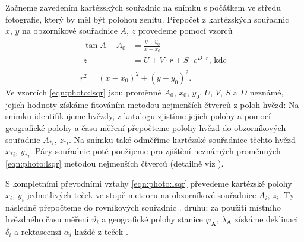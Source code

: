Začneme zavedením kartézských souřadnic na snímku s počátkem ve středu fotografie, který by měl být polohou zenitu. Přepočet z kartézských souřadnic $x,\,y$ na obzorníkové souřadnice $A,\,z$ provedeme pomocí vzorců \cite{ceplecha}
\begin{eqnarray}
    \begin{aligned}
        \tan{A-A_0} & =\frac{y-y_0}{x-x_0}                        \\
        z           & =U+V\cdot r+S\cdot e^{D\cdot r}\text{, kde}
    \end{aligned}\label{eqn:photo:lsqr}\\
    r^2=(x-x_0)^2+(y-y_0)^2\text{.}
\end{eqnarray}
Ve vzorcích \eqref{eqn:photo:lsqr} jsou proměnné $A_0,\,x_0,\,y_0,\,U,\,V,\,S$ a $D$ neznámé, jejich hodnoty získáme fitováním metodou nejmenších čtverců z poloh hvězd: Na snímku identifikujeme hvězdy, z katalogu zjistíme jejich polohy a pomocí geografické polohy a času měření přepočteme polohy hvězd do obzorníkových souřadnic $A_{\ast i},\,z_{\ast i}$. Na snímku také odměříme kartézské souřadnice těchto hvězd $x_{\ast i},\,y_{\ast i}$. Páry souřadnic poté použijeme pro zjištění neznámých proměnných \eqref{eqn:photo:lsqr} metodou nejmenších čtverců (detailně viz \cite[223--224]{ceplecha}).

S kompletními převodními vztahy \eqref{eqn:photo:lsqr} převedeme kartézské polohy $x_i,\,y_i$ jednotlivých teček ve stopě meteoru na obzorníkové souřadnice $A_i,\,z_i$. Ty následně přepočteme do rovníkových souřadnic {\uppercase\expandafter{\relax}}. druhu; za použití místního hvězdného času měření $\vartheta_i$ a geografické polohy stanice $\varphi_\mathbf{A},\,\lambda_\mathbf{A}$ získáme deklinaci $\delta_i$ a rektascenzi $\alpha_i$ každé z teček \cite{ceplecha}.

